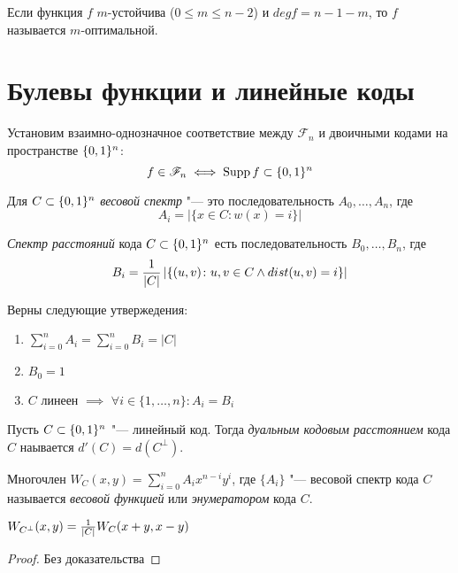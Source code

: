 \begin{definition}
Если функция $f$ $m$-устойчива ($0 \le m \le n-2$) и $deg f = n-1-m$,
то $f$ называется $m$-оптимальной.
\end{definition}

\section{Булевы функции и линейные коды}

Установим взаимно-однозначное соответствие между $\mathscr{F}_n$
и двоичными кодами на пространстве $\{0,1\}^n$:
$$f \in \mathscr{F}_n \iff \operatorname*{Supp} f \subset \{0,1\}^n$$

\begin{definition}
Для $C \subset \{0,1\}^n$ \emph{весовой спектр} "--- это последовательность
$A_0, \ldots, A_n$, где $$A_i = |\{x \in C \colon w(x) = i\}|$$
\end{definition}

\begin{definition}
\emph{Спектр расстояний} кода $C \subset \{0,1\}^n$ есть последовательность
$B_0, \ldots, B_n$, где
$$B_i = {1 \over |C|} \left|\left\{ (u,v) \colon u,v \in C \land dist(u,v) = i\right\}\right|$$
\end{definition}

\begin{remark}
Верны следующие утвержедения:
\begin{enumerate}
\item $\sum\limits_{i=0}^n A_i = \sum\limits_{i=0}^n B_i = |C|$
\item $B_0 = 1$
\item $C$ линеен $\implies$ $\forall i \in \{1,\ldots, n\} \colon A_i = B_i$
\end{enumerate}
\end{remark}

\begin{definition}
Пусть $C \subset \{0,1\}^n$ "--- линейный код. Тогда \emph{дуальным кодовым
расстоянием} кода $C$ наывается $d'(C) = d(C^{\bot})$.
\end{definition}

\begin{definition}
Многочлен $W_C (x,y) = \sum\limits_{i=0}^n A_i x^{n-i} y^i$, где $\{A_i\}$ 
"--- весовой спектр кода $C$ называется \emph{весовой функцией} или 
\emph{энумератором} кода $C$.
\end{definition}

\begin{theorem}
\label{mac-williams1}
$W_{C^{\bot}} (x,y) = {1 \over |C|} W_C (x+y, x-y)$
\end{theorem}
\begin{proof}
Без доказательства
\end{proof}


